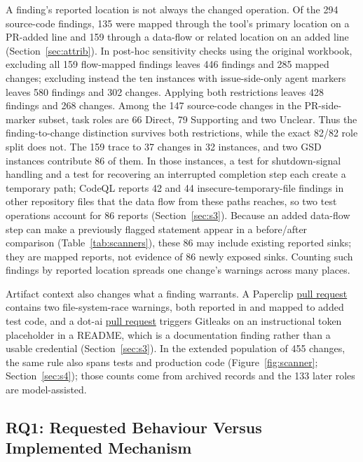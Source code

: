 \documentclass[acmsmall,screen,nonacm]{acmart}
\begin{document}
A finding's reported location is not always the changed operation. Of the 294 source-code findings, 135 were mapped through the tool's primary location on a PR-added line and 159 through a data-flow or related location on an added line (Section~\ref{sec:attrib}). In post-hoc sensitivity checks using the original workbook, excluding all 159 flow-mapped findings leaves 446 findings and 285 mapped changes; excluding instead the ten instances with issue-side-only agent markers leaves 580 findings and 302 changes. Applying both restrictions leaves 428 findings and 268 changes. Among the 147 source-code changes in the PR-side-marker subset, task roles are 66 Direct, 79 Supporting and two Unclear. Thus the finding-to-change distinction survives both restrictions, while the exact 82/82 role split does not. The 159 trace to 37 changes in 32 instances, and two GSD instances contribute 86 of them. In those instances, a test for shutdown-signal handling and a test for recovering an interrupted completion step each create a temporary path; CodeQL reports 42 and 44 insecure-temporary-file findings in other repository files that the data flow from these paths reaches, so two test operations account for 86 reports (Section~\ref{sec:s3}). Because an added data-flow step can make a previously flagged statement appear in a before/after comparison (Table~\ref{tab:scanners}), these 86 may include existing reported sinks; they are mapped reports, not evidence of 86 newly exposed sinks. Counting such findings by reported location spreads one change's warnings across many places.

Artifact context also changes what a finding warrants. A Paperclip \href{https://github.com/paperclipai/paperclip/pull/5240}{pull request} contains two file-system-race warnings, both reported in and mapped to added test code, and a dot-ai \href{https://github.com/vfarcic/dot-ai/pull/286}{pull request} triggers Gitleaks on an instructional token placeholder in a README, which is a documentation finding rather than a usable credential (Section~\ref{sec:s3}). In the extended population of 455 changes, the same rule also spans tests and production code (Figure~\ref{fig:scanner}; Section~\ref{sec:s4}); those counts come from archived records and the 133 later roles are model-assisted.

\subsection{RQ1: Requested Behaviour Versus Implemented Mechanism}\label{sec:rq1-open}
\end{document}
